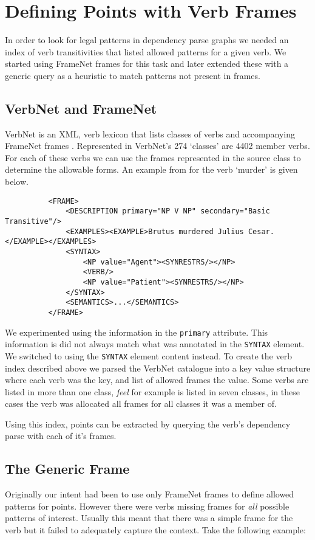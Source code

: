   \section{Defining Points with Verb Frames}
    In order to look for legal patterns in dependency parse graphs we needed an index of verb transitivities that listed allowed patterns for a given verb. We started using FrameNet frames for this task and later extended these with a generic query as a heuristic to match patterns not present in frames.
    \tocless\subsection{VerbNet and FrameNet}
      VerbNet is an XML, verb lexicon that lists classes of verbs and accompanying FrameNet frames \cite{schuler2005verbnet,fillmore2002framenet}. Represented in VerbNet's 274 `classes' are 4402 member verbs. For each of these verbs we can use the frames represented in the source class to determine the allowable forms. An example from for the verb `murder' is given below.

      \lstset{language=XML}
      \begin{lstlisting}
          <FRAME>
              <DESCRIPTION primary="NP V NP" secondary="Basic Transitive"/>
              <EXAMPLES><EXAMPLE>Brutus murdered Julius Cesar.</EXAMPLE></EXAMPLES>
              <SYNTAX>
                  <NP value="Agent"><SYNRESTRS/></NP>
                  <VERB/>
                  <NP value="Patient"><SYNRESTRS/></NP>
              </SYNTAX>
              <SEMANTICS>...</SEMANTICS>
          </FRAME>
      \end{lstlisting}

      We experimented using the information in the \texttt{primary} attribute. This information is did not always match what was annotated in the \texttt{SYNTAX} element. We switched to using the \texttt{SYNTAX} element content instead. To create the verb index described above we parsed the VerbNet catalogue into a key value structure where each verb was the key, and list of allowed frames the value. Some verbs are listed in more than one class, \textit{feel} for example is listed in seven classes, in these cases the verb was allocated all frames for all classes it was a member of.

      Using this index, points can be extracted by querying the verb's dependency parse with each of it's frames.

    \tocless\subsection{The Generic Frame}
      Originally our intent had been to use only FrameNet frames to define allowed patterns for points. However there were verbs missing frames for \textit{all} possible patterns of interest. Usually this meant that there was a simple frame for the verb but it failed to adequately capture the context. Take the following example:

